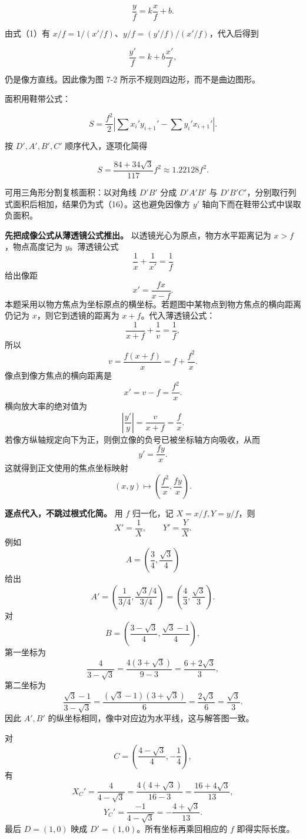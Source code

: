 \documentclass[12pt,a4paper,UTF8]{ctexart}
\begin{document}
\[
\frac yf=k\frac xf+b. \tag{13}
\]

由式（1）有 \(x/f=1/(x'/f)\)、\(y/f=(y'/f)/(x'/f)\)，代入后得到

\[
\frac{y'}f=k+b\frac{x'}f, \tag{14}
\]

仍是像方直线。因此像为图 7-2 所示不规则四边形，而不是曲边图形。

面积用鞋带公式：

\[
S=\frac{f^2}{2}
\left|
\sum x_i'y_{i+1}'-\sum y_i'x_{i+1}'
\right|. \tag{15}
\]

按 \(D',A',B',C'\) 顺序代入，逐项化简得

\[
\boxed{
S=\frac{84+34\sqrt3}{117}f^2
\approx1.22128f^2}. \tag{16}
\]

可用三角形分割复核面积：以对角线 \(D'B'\) 分成 \(D'A'B'\) 与
\(D'B'C'\)，分别取行列式面积后相加，结果仍为式（16）。这也避免因像方
\(y'\) 轴向下而在鞋带公式中误取负面积。

\textbf{先把成像公式从薄透镜公式推出。}
以透镜光心为原点，物方水平距离记为 \(x>f\)，物点高度记为
\(y\)。薄透镜公式 \[
\frac1x+\frac1{x'}=\frac1f
\] 给出像距 \[
x'=\frac{fx}{x-f}.
\]
本题采用以物方焦点为坐标原点的横坐标。若题图中某物点到物方焦点的横向距离仍记为
\(x\)，则它到透镜的距离为 \(x+f\)。代入薄透镜公式： \[
\frac1{x+f}+\frac1v=\frac1f,
\] 所以 \[
v=\frac{f(x+f)}x=f+\frac{f^2}{x}.
\] 像点到像方焦点的横向距离是 \[
x'=v-f=\frac{f^2}{x}.
\] 横向放大率的绝对值为 \[
\left|\frac{y'}y\right|=\frac v{x+f}=\frac fx.
\] 若像方纵轴规定向下为正，则倒立像的负号已被坐标轴方向吸收，从而 \[
y'=\frac{fy}{x}.
\] 这就得到正文使用的焦点坐标映射 \[
(x,y)\longmapsto
\left(\frac{f^2}{x},\frac{fy}{x}\right).
\]

\textbf{逐点代入，不跳过根式化简。} 用 \(f\) 归一化，记
\(X=x/f,Y=y/f\)，则 \[
X'=\frac1X,\qquad Y'=\frac YX.
\] 例如 \[
A=\left(\frac34,\frac{\sqrt3}{4}\right)
\] 给出 \[
A'=\left(\frac{1}{3/4},
\frac{\sqrt3/4}{3/4}\right)
=\left(\frac43,\frac{\sqrt3}{3}\right).
\] 对 \[
B=\left(\frac{3-\sqrt3}{4},
\frac{\sqrt3-1}{4}\right),
\] 第一坐标为 \[
\frac4{3-\sqrt3}
=\frac{4(3+\sqrt3)}{9-3}
=\frac{6+2\sqrt3}{3},
\] 第二坐标为 \[
\frac{\sqrt3-1}{3-\sqrt3}
=\frac{(\sqrt3-1)(3+\sqrt3)}6
=\frac{2\sqrt3}{6}
=\frac{\sqrt3}{3}.
\] 因此 \(A',B'\) 的纵坐标相同，像中对应边为水平线，这与解答图一致。

对 \[
C=\left(\frac{4-\sqrt3}{4},-\frac14\right),
\] 有 \[
X_C'=\frac4{4-\sqrt3}
=\frac{4(4+\sqrt3)}{16-3}
=\frac{16+4\sqrt3}{13},
\] \[
Y_C'=\frac{-1}{4-\sqrt3}
=-\frac{4+\sqrt3}{13}.
\] 最后 \(D=(1,0)\) 映成 \(D'=(1,0)\)。所有坐标再乘回相应的 \(f\)
即得实际长度。
\end{document}
